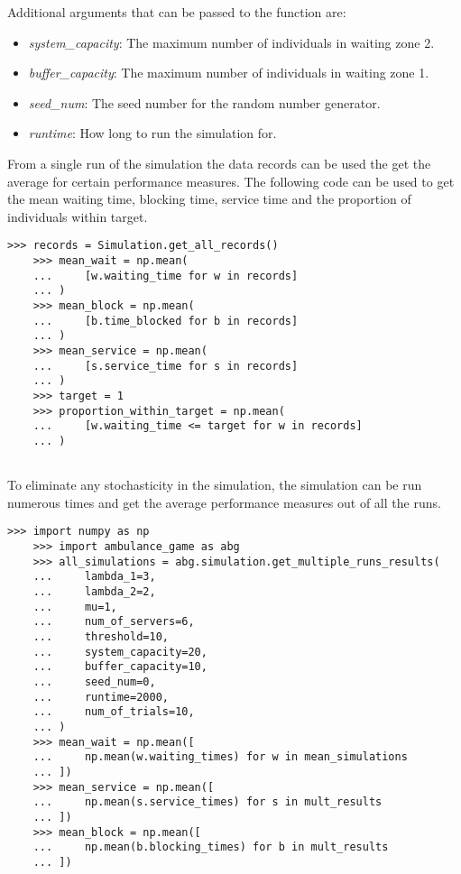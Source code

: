 Additional arguments that can be passed to the function are:
\begin{itemize}
    \item \textit{system\_capacity}: The maximum number of individuals in 
    waiting zone 2.
    \item \textit{buffer\_capacity}: The maximum number of individuals in 
    waiting zone 1.
    \item \textit{seed\_num}: The seed number for the random number generator.
    \item \textit{runtime}: How long to run the simulation for.
\end{itemize}

From a single run of the simulation the data records can be used the get the
average for certain performance measures. 
The following code can be used to get the mean waiting time, blocking time, 
service time and the proportion of individuals within target.

\begin{lstlisting}[style=pystyle]
    >>> records = Simulation.get_all_records()
    >>> mean_wait = np.mean(
    ...     [w.waiting_time for w in records]
    ... )
    >>> mean_block = np.mean(
    ...     [b.time_blocked for b in records]
    ... )
    >>> mean_service = np.mean(
    ...     [s.service_time for s in records]
    ... )
    >>> target = 1
    >>> proportion_within_target = np.mean(
    ...     [w.waiting_time <= target for w in records]
    ... )
    
\end{lstlisting}


To eliminate any stochasticity in the simulation, the simulation can be run
numerous times and get the average performance measures out of all the runs.


\begin{lstlisting}[style=pystyle]
    >>> import numpy as np
    >>> import ambulance_game as abg
    >>> all_simulations = abg.simulation.get_multiple_runs_results(
    ...     lambda_1=3,
    ...     lambda_2=2,
    ...     mu=1,
    ...     num_of_servers=6,
    ...     threshold=10,
    ...     system_capacity=20,
    ...     buffer_capacity=10,
    ...     seed_num=0,
    ...     runtime=2000,
    ...     num_of_trials=10,
    ... )
    >>> mean_wait = np.mean([
    ...     np.mean(w.waiting_times) for w in mean_simulations
    ... ])
    >>> mean_service = np.mean([
    ...     np.mean(s.service_times) for s in mult_results
    ... ])
    >>> mean_block = np.mean([
    ...     np.mean(b.blocking_times) for b in mult_results
    ... ])
\end{lstlisting}

